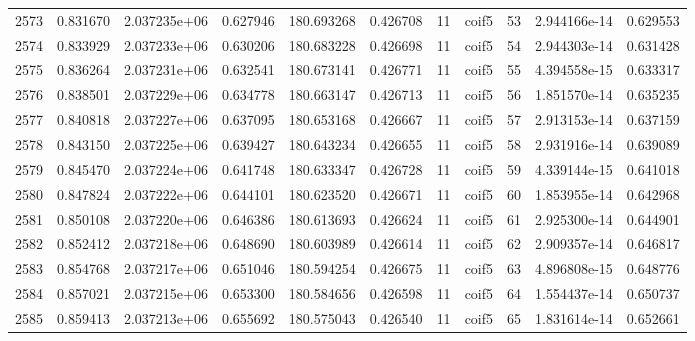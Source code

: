 \begin{tabular}{lrrrrrrlrrr}
2573 &    0.831670 &        2.037235e+06 &  0.627946 &              180.693268 &    0.426708 &      11 &        coif5 &     53 &   2.944166e-14 &      0.629553 \\
2574 &    0.833929 &        2.037233e+06 &  0.630206 &              180.683228 &    0.426698 &      11 &        coif5 &     54 &   2.944303e-14 &      0.631428 \\
2575 &    0.836264 &        2.037231e+06 &  0.632541 &              180.673141 &    0.426771 &      11 &        coif5 &     55 &   4.394558e-15 &      0.633317 \\
2576 &    0.838501 &        2.037229e+06 &  0.634778 &              180.663147 &    0.426713 &      11 &        coif5 &     56 &   1.851570e-14 &      0.635235 \\
2577 &    0.840818 &        2.037227e+06 &  0.637095 &              180.653168 &    0.426667 &      11 &        coif5 &     57 &   2.913153e-14 &      0.637159 \\
2578 &    0.843150 &        2.037225e+06 &  0.639427 &              180.643234 &    0.426655 &      11 &        coif5 &     58 &   2.931916e-14 &      0.639089 \\
2579 &    0.845470 &        2.037224e+06 &  0.641748 &              180.633347 &    0.426728 &      11 &        coif5 &     59 &   4.339144e-15 &      0.641018 \\
2580 &    0.847824 &        2.037222e+06 &  0.644101 &              180.623520 &    0.426671 &      11 &        coif5 &     60 &   1.853955e-14 &      0.642968 \\
2581 &    0.850108 &        2.037220e+06 &  0.646386 &              180.613693 &    0.426624 &      11 &        coif5 &     61 &   2.925300e-14 &      0.644901 \\
2582 &    0.852412 &        2.037218e+06 &  0.648690 &              180.603989 &    0.426614 &      11 &        coif5 &     62 &   2.909357e-14 &      0.646817 \\
2583 &    0.854768 &        2.037217e+06 &  0.651046 &              180.594254 &    0.426675 &      11 &        coif5 &     63 &   4.896808e-15 &      0.648776 \\
2584 &    0.857021 &        2.037215e+06 &  0.653300 &              180.584656 &    0.426598 &      11 &        coif5 &     64 &   1.554437e-14 &      0.650737 \\
2585 &    0.859413 &        2.037213e+06 &  0.655692 &              180.575043 &    0.426540 &      11 &        coif5 &     65 &   1.831614e-14 &      0.652661 \\

\end{tabular}
